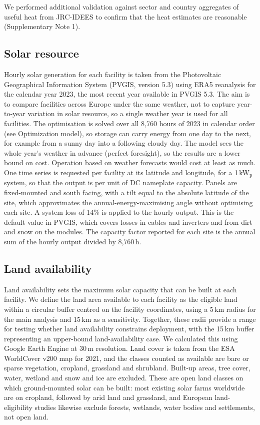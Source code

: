 \documentclass[11pt]{article}
\begin{document}
We performed additional validation against sector and country aggregates of useful heat from JRC-IDEES\cite{jrcidees2023} to confirm that the heat estimates are reasonable (Supplementary Note 1).

\subsection*{Solar resource}
Hourly solar generation for each facility is taken from the Photovoltaic Geographical Information System (PVGIS, version 5.3)\cite{huld2012pvgis,pvgis53} using ERA5 reanalysis\cite{hersbach2020era5} for the calendar year 2023, the most recent year available in PVGIS 5.3\cite{pvgis53}. The aim is to compare facilities across Europe under the same weather, not to capture year-to-year variation in solar resource, so a single weather year is used for all facilities. The optimisation is solved over all 8,760 hours of 2023 in calendar order (see Optimization model), so storage can carry energy from one day to the next, for example from a sunny day into a following cloudy day. The model sees the whole year's weather in advance (perfect foresight), so the results are a lower bound on cost. Operation based on weather forecasts would cost at least as much. One time series is requested per facility at its latitude and longitude, for a 1\,kW$_\mathrm{p}$ system, so that the output is per unit of DC nameplate capacity. Panels are fixed-mounted and south facing, with a tilt equal to the absolute latitude of the site, which approximates the annual-energy-maximising angle without optimising each site. A system loss of 14\% is applied to the hourly output. This is the default value in PVGIS, which covers losses in cables and inverters and from dirt and snow on the modules\cite{pvgismanual}. The capacity factor reported for each site is the annual sum of the hourly output divided by 8,760\,h.

\subsection*{Land availability}
Land availability sets the maximum solar capacity that can be built at each facility. We define the land area available to each facility as the eligible land within a circular buffer centred on the facility coordinates, using a 5\,km radius for the main analysis and 15\,km as a sensitivity. Together, these radii provide a range for testing whether land availability constrains deployment, with the 15\,km buffer representing an upper-bound land-availability case. We calculated this using Google Earth Engine at 30\,m resolution. Land cover is taken from the ESA WorldCover v200 map for 2021\cite{zanaga2022worldcover}, and the classes counted as available are bare or sparse vegetation, cropland, grassland and shrubland. Built-up areas, tree cover, water, wetland and snow and ice are excluded. These are open land classes on which ground-mounted solar can be built: most existing solar farms worldwide are on cropland, followed by arid land and grassland\cite{kruitwagen2021}, and European land-eligibility studies likewise exclude forests, wetlands, water bodies and settlements, not open land\cite{ryberg2018}.
\end{document}
